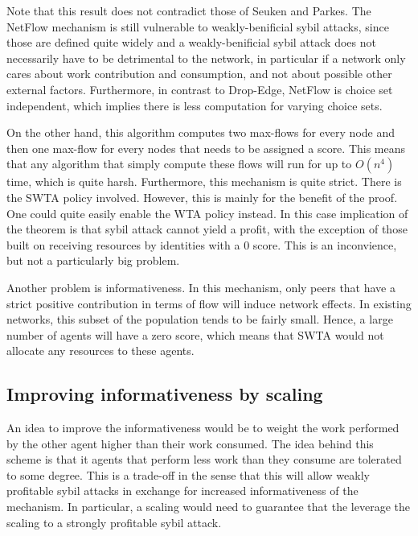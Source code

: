 \documentclass[a4paper,11pt]{book}
\theoremstyle{definition}
\begin{document}
Note that this result does not contradict those of Seuken and Parkes. The NetFlow mechanism is
still vulnerable to weakly-benificial sybil attacks, since those are defined quite widely and
a weakly-benificial sybil attack does not necessarily have to be detrimental to the network,
in particular if a network only cares about work contribution and consumption, and
not about possible other external factors. Furthermore, in contrast to Drop-Edge, NetFlow
is choice set independent, which implies there is less computation for varying choice sets.


On the other hand, this algorithm computes two max-flows for every node and then one max-flow for
every nodes that needs to be assigned a score. This means that any algorithm that simply compute
these flows will run for up to $O(n^4)$ time, which is quite harsh. 
Furthermore, this mechanism is quite strict. There is the SWTA policy involved. However,
this is mainly for the benefit of the proof. One could quite easily enable the WTA policy instead.
In this case implication of the theorem is that sybil attack cannot yield a profit, with the exception
of those built on receiving resources by identities with a $0$ score. This is an inconvience,
but not a particularly big problem. 

Another problem is informativeness. In this mechanism,
only peers that have a strict positive contribution in terms of flow will induce network effects.
In existing networks, this subset of the population tends to be fairly small. Hence, a large
number of agents will have a zero score, which means that SWTA would not allocate any resources
to these agents.

\subsection{Improving informativeness by scaling}
An idea to improve the informativeness would be to weight the work performed by the other
agent higher than their work consumed. The idea behind this scheme is that it agents
that perform less work than they consume are tolerated to some degree. This is a trade-off
in the sense that this will allow weakly profitable sybil attacks in exchange for increased
informativeness of the mechanism. In particular, a scaling would need to guarantee
that the leverage the scaling to a strongly profitable sybil attack. 
\end{document}
